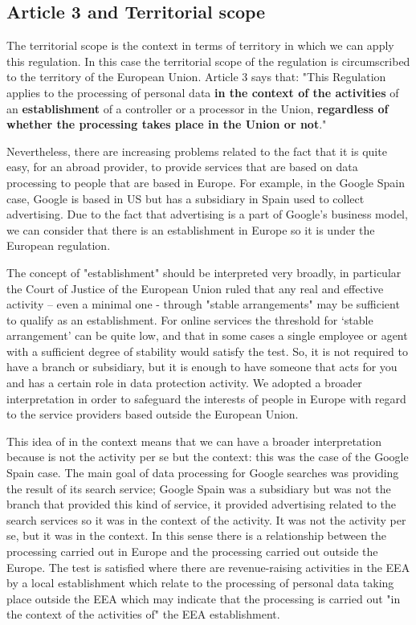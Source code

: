 \subsection{Article 3 and Territorial scope}
The territorial scope is the context in terms of territory in which we can apply this regulation. In this case the territorial scope of the regulation is circumscribed to the territory of the European Union.
Article 3 says that: "This Regulation applies to the processing of personal data \textbf{in the context of the activities} of an \textbf{establishment} of a controller or a processor in the Union, \textbf{regardless of whether the processing takes place in the Union or not}."

Nevertheless, there are increasing problems related to the fact that it is quite easy, for an abroad provider, to provide services that are based on data processing to people that are based in Europe. For example, in the Google Spain case, Google is based in US but has a subsidiary in Spain used to collect advertising. Due to the fact that advertising is a part of Google's business model, we can consider that there is an establishment in Europe so it is under the European regulation.

The concept of "establishment" should be interpreted very broadly, in particular the Court of Justice of the European Union ruled that any real and effective activity – even a minimal one - through "stable arrangements" may be sufficient to qualify as an establishment. For online services the threshold for ‘stable arrangement’ can be quite low, and that in some cases a single employee or agent with a sufficient degree of stability would satisfy the test. So, it is not required to have a branch or subsidiary, but it is enough to have someone that acts for you and has a certain role in data protection activity. We adopted a broader interpretation in order to safeguard the interests of people in Europe with regard to the service providers based outside the European Union.

This idea of in the context means that we can have a broader interpretation because is not the activity per se but the context: this was the case of the Google Spain case. The main goal of data processing for Google searches was providing the result of its search service; Google Spain was a subsidiary but was not the branch that provided this kind of service, it provided advertising related to the search services so it was in the context of the activity. It was not the activity per se, but it was in the context. In this sense there is a relationship between the processing carried out in Europe and the processing carried out outside the Europe.
The test is satisfied where there are revenue-raising activities in the EEA by a local establishment which relate to the processing of personal data taking place outside the EEA which may indicate that the processing is carried out "in the context of the activities of" the EEA establishment.

